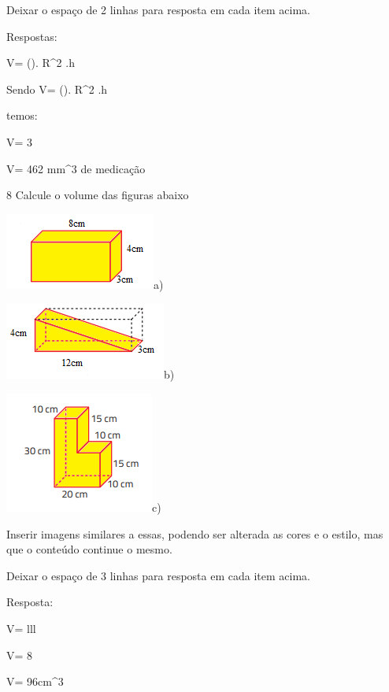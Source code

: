 Deixar o espaço de 2 linhas para resposta em cada item acima.

Respostas:

\item V= (\Pi). R^2 .h
\item Sendo V= (\Pi). R^2 .h

temos:

V= 3

V= 462 mm^3 de medicação

\num{8} Calcule o volume das figuras abaixo

\includegraphics[width=1\times 94792in,height=0\times 98958in]{./imgSAEB_8_MAT/media/image51.png}a)

\includegraphics[width=2\times 08333in,height=1in]{./imgSAEB_8_MAT/media/image52.png}b)

\includegraphics[width=1\times 92708in,height=1\times 5625in]{./imgSAEB_8_MAT/media/image53.png}c)

Inserir imagens similares a essas, podendo ser alterada as cores e o
estilo, mas que o conteúdo continue o mesmo.

Deixar o espaço de 3 linhas para resposta em cada item acima.

Resposta:

\item 

V= l\times l\times l

V= 8

V= 96cm^3

\item 

